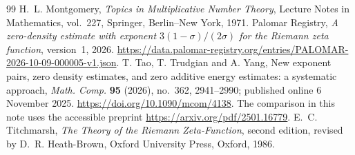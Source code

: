 \documentclass[11pt,a4paper]{article}
\numberwithin{equation}{section}
\theoremstyle{definition}
\begin{document}
\begin{thebibliography}{99}
 H.~L. Montgomery, \emph{Topics in Multiplicative Number Theory},
Lecture Notes in Mathematics, vol.~227, Springer, Berlin--New York, 1971.
 Palomar Registry, \emph{A zero-density estimate with exponent
$3(1-\sigma)/(2\sigma)$ for the Riemann zeta function}, version~1, 2026.
\url{https://data.palomar-registry.org/entries/PALOMAR-2026-10-09-000005-v1.json}.
 T. Tao, T. Trudgian and A. Yang,
New exponent pairs, zero density estimates, and zero additive energy estimates:
a systematic approach, \emph{Math. Comp.} \textbf{95} (2026), no.~362, 2941--2990;
published online 6 November 2025.
\url{https://doi.org/10.1090/mcom/4138}.
The comparison in this note uses the accessible preprint
\url{https://arxiv.org/pdf/2501.16779}.
 E.~C. Titchmarsh, \emph{The Theory of the Riemann Zeta-Function},
second edition, revised by D.~R. Heath-Brown, Oxford University Press, Oxford, 1986.
\end{thebibliography}
\end{document}
